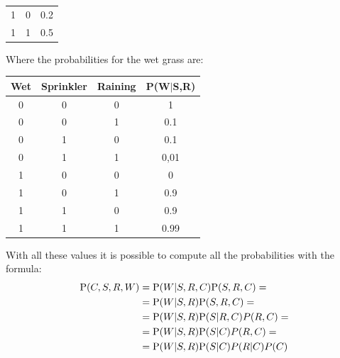 \begin{example}
\begin{table}[H]
\begin{tabular}{ccc}
        1       & 0      & 0.2    \\
        1       & 1      & 0.5    \\ \hline
        \end{tabular}
    \end{table}
    Where the probabilities for the wet grass are: 
    \begin{table}[H]
        \centering
        \begin{tabular}{cccc}
        \hline
        \textbf{Wet} & \textbf{Sprinkler} & \textbf{Raining} & \textbf{P(W$|$S,R)} \\ \hline
        0            & 0                  & 0                & 1                   \\
        0            & 0                  & 1                & 0.1                 \\
        0            & 1                  & 0                & 0.1                 \\
        0            & 1                  & 1                & 0,01                \\
        1            & 0                  & 0                & 0                   \\
        1            & 0                  & 1                & 0.9                 \\
        1            & 1                  & 0                & 0.9                 \\
        1            & 1                  & 1                & 0.99                \\ \hline
        \end{tabular}
    \end{table}
    With all these values it is possible to compute all the probabilities with the formula: 
    \[
    \begin{aligned}
        \textnormal{P}(C,S,R,W)     &= \textnormal{P}(W|S,R,C)\textnormal{P}(S,R,C)=      \\
                                    &= \textnormal{P}(W|S,R)\textnormal{P}(S,R,C)=        \\
                                    &= \textnormal{P}(W|S,R)\textnormal{P}(S|R,C)P(R,C)=  \\
                                    &= \textnormal{P}(W|S,R)\textnormal{P}(S|C)P(R,C)=    \\
                                    &= \textnormal{P}(W|S,R)\textnormal{P}(S|C)P(R|C)P(C)
    \end{aligned}
\]
\end{example}
